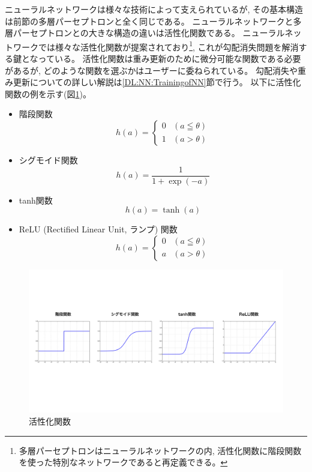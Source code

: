 ニューラルネットワークは様々な技術によって支えられているが, その基本構造は前節の多層パーセプトロンと全く同じである。
ニューラルネットワークと多層パーセプトロンとの大きな構造の違いは活性化関数である。
ニューラルネットワークでは様々な活性化関数が提案されており\footnote{多層パーセプトロンはニューラルネットワークの内, 活性化関数に階段関数を使った特別なネットワークであると再定義できる。}, これが勾配消失問題を解消する鍵となっている。
活性化関数は重み更新のために微分可能な関数である必要があるが, どのような関数を選ぶかはユーザーに委ねられている。
勾配消失や重み更新についての詳しい解説は\ref{DL:NN:TrainingofNN}節で行う。
以下に活性化関数の例を示す(図\ref{5ActivationFunction})。
\begin{itemize}
  \item 階段関数
\begin{equation}
 h(a) = \left\{ \begin{array}{ll}
    0 & (a \leqq \theta) \\
    1 & (a > \theta)
 \end{array} \right.
\end{equation}
  \item シグモイド関数
\begin{equation}
 h(a) = \frac{1}{1+\exp{(-a)}}
\end{equation}
  \item tanh関数
\begin{equation}
 h(a) = \tanh{(a)}
\end{equation}
  \item ReLU (Rectified Linear Unit, ランプ) 関数\cite{ReLUpaper}
\begin{equation}
 h(a) = \left\{ \begin{array}{ll}
    0 & (a \leqq \theta) \\
    a & (a > \theta)
 \end{array} \right.
\end{equation}
\end{itemize}

\begin{figure}[htbp]
 \centering
 \includegraphics[trim = 0 250 0 250, width=1.0\textwidth, clip]{Figure/2DeepLearning/5ActivationFunction.png}
 \caption{活性化関数}
 \label{5ActivationFunction}
\end{figure}

